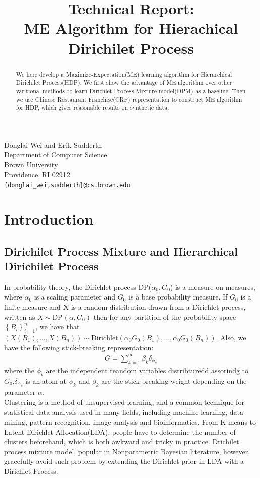 \documentclass{article}
\title{Technical Report:\\ME Algorithm for Hierachical Dirichilet Process}
\author{}
\begin{document}
Donglai Wei and Erik Sudderth \\
Department of Computer Science\\
Brown University\\
Providence, RI 02912 \\
\texttt{\{donglai\_wei,sudderth\}@cs.brown.edu} \\

\makeanontitle

\begin{abstract}We here develop a Maximize-Expectation(ME) learning algorithm for Hierarchical Dirichilet Process(HDP).
We first show the advantage of ME algorithm over other varitional methods to learn Dirichlet Process Mixture model(DPM) as a baseline. 
Then we use Chinese Restaurant Franchise(CRF) representation to construct ME algorithm for HDP, which 
gives reasonable results on synthetic data. 

\end{abstract}

\section{Introduction}
\subsection{Dirichilet Process Mixture and Hierarchical Dirichilet Process}
In probability theory, the Dirichlet process DP($\alpha_{0},G_{0}$) is a measure on measures, where $\alpha_{0}$ is a scaling
parameter and $G_{0}$ is a base probability measure. 
If $G_{0}$ is a finite measure and X is a random distribution drawn from a Dirichlet process, written as $X \sim \mathrm{DP}\left(\alpha,G_{0}\right)$
then for any partition of the probability space $\left\{B_i\right\}_{i=1}^{n}$, we have that
$\left(X\left(B_1\right),\dots,X\left(B_n\right)\right) \sim \mathrm{Dirichlet}\left(\alpha_{0}G_{0}\left(B_1\right),\dots,\alpha_{0}G_{0}\left(B_n\right)\right)$.
Also, we have the following stick-breaking representation:
\begin{eqnarray*}
 G=\sum_{k=1}^{\infty} \beta_{k}\delta_{\phi_{k}}
\end{eqnarray*}
where the $\phi_{k}$ are the independent reandom variables distribturedd assorindg to $G_{0}$,$\delta_{\phi_{k}}$ is an atom at $\phi_{k}$
and $\beta_{k}$ are the stick-breaking weight depending on the parameter $\alpha$.\\

Clustering is a method of unsupervised learning, and a common technique for statistical data analysis used in many fields, including machine learning, data mining, pattern recognition, image analysis and bioinformatics.
From K-means to Latent Dirichlet Allocation(LDA), people have to determine the number of clusters beforehand, which is both awkward and tricky in practice.
Drichilet process mixture model, popular in Nonparametric Bayesian literature, however, gracefully avoid such problem by extending the 
Dirichlet prior in LDA with a Dirichlet Process. \\
\end{document}
